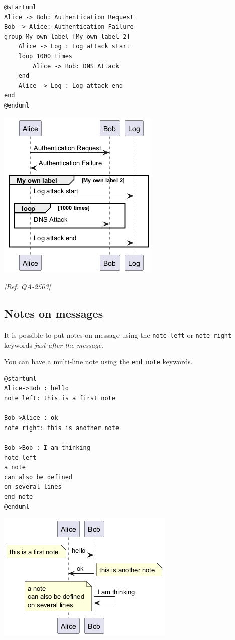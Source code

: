 \begin{verbatim}
@startuml
Alice -> Bob: Authentication Request
Bob -> Alice: Authentication Failure
group My own label [My own label 2]
    Alice -> Log : Log attack start
    loop 1000 times
        Alice -> Bob: DNS Attack
    end
    Alice -> Log : Log attack end
end
@enduml
\end{verbatim}
\begin{center}
\includegraphics[scale=0.60]{imgw/img-5af95ec979995fb20ab14e22575e99c2.png}
\end{center}


\textit{[Ref. QA-2503]}
%
%
\subsection{Notes on messages}


It is possible to put notes on message using the \texttt{note left}
or \texttt{note right} keywords \textit{just after the message}.


You can have a multi-line note using the \texttt{end note}
keywords.


\begin{verbatim}
@startuml
Alice->Bob : hello
note left: this is a first note

Bob->Alice : ok
note right: this is another note

Bob->Bob : I am thinking
note left
a note
can also be defined
on several lines
end note
@enduml
\end{verbatim}
\begin{center}
\includegraphics[scale=0.60]{imgw/img-fb83d0b13cee295e367a6909b5c8ac34.png}
\end{center}


